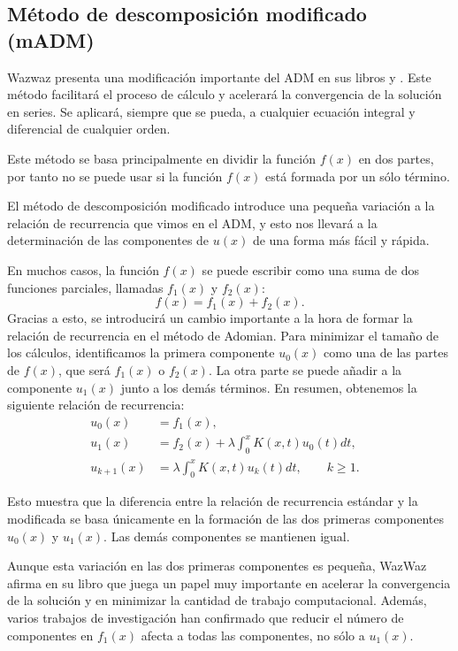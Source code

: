 \subsection{Método de descomposición modificado (mADM)}
Wazwaz presenta una modificación importante del ADM en sus libros \cite{WazWaz1} y \cite{WazWaz2}. Este método facilitará el proceso de cálculo y acelerará la convergencia de la solución en series. Se aplicará, siempre que se pueda, a cualquier ecuación integral y diferencial de cualquier orden.
\begin{observacion}
	Este método se basa principalmente en dividir la función $f(x)$ en dos partes, por tanto no se puede usar si la función $f(x)$ está formada por un sólo término.
\end{observacion}
El método de descomposición modificado introduce una pequeña variación a la relación de recurrencia que vimos en el ADM, y esto nos llevará a la determinación de las componentes de $u(x)$ de una forma más fácil y rápida.

En muchos casos, la función $f(x)$ se puede escribir como una suma de dos funciones parciales, llamadas $f_1(x)$ y $f_2(x)$:
\begin{equation}
	f(x) = f_1(x) + f_2(x).
\end{equation}
Gracias a esto, se introducirá un cambio importante a la hora de formar la relación de recurrencia en el método de Adomian. Para minimizar el tamaño de los cálculos, identificamos la primera componente $u_0(x)$ como una de las partes de $f(x)$, que será $f_1(x)$ o $f_2(x)$. La otra parte se puede añadir a la componente $u_1(x)$ junto a los demás términos. En resumen, obtenemos la siguiente relación de recurrencia:
\begin{align}
	u_0(x) &= f_1(x),      &   \\
	u_{1}(x) &= f_2(x) + \lambda \int_{0}^{x} K(x,t)u_0(t)dt,    &  \\
	u_{k+1}(x) &= \lambda \int_{0}^{x} K(x,t)u_k(t)dt, \qquad k \geqslant 1.    &
\end{align}	
\begin{observacion}
	Esto muestra que la diferencia entre la relación de recurrencia estándar y la modificada se basa únicamente en la formación de las dos primeras componentes $u_0(x)$ y $u_1(x)$. Las demás componentes se mantienen igual.
\end{observacion}
Aunque esta variación en las dos primeras componentes es pequeña, WazWaz afirma en su libro \cite{WazWaz} que juega un papel muy importante en acelerar la convergencia de la solución y en minimizar la cantidad de trabajo computacional. Además, varios trabajos de investigación han confirmado que reducir el número de componentes en $f_1(x)$ afecta a todas las componentes, no sólo a $u_1(x)$.

